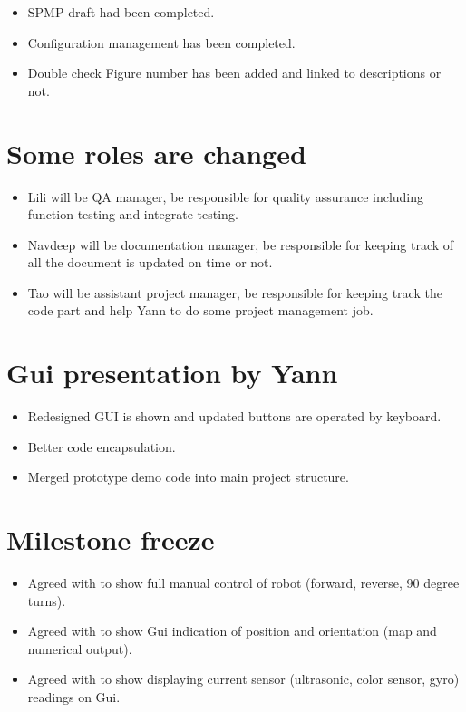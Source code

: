 \documentclass[11pt, a4paper]{article}
\begin{document}
\begin{itemize}
\item SPMP draft had been completed. 
\item Configuration management has been completed.
\item Double check Figure number has been added and linked to descriptions or not.
\end{itemize}

\section{Some roles are changed}

\begin{itemize}
\item Lili will be QA manager, be responsible for quality assurance including function testing and integrate testing.
\item Navdeep will be documentation manager, be responsible for keeping track of all the document is updated on time or not.
\item Tao will be assistant project manager, be responsible for keeping track the code part and help Yann to do some project management job.
\end{itemize}

\section{Gui presentation by Yann}

\begin{itemize}
\item Redesigned GUI is shown and updated buttons are operated by keyboard.
\item Better code encapsulation.
\item Merged prototype demo code into main project structure.
\end{itemize}

\section{Milestone freeze}
\begin{itemize}
\item Agreed with to show full manual control of robot (forward, reverse, 90 degree turns).
\item Agreed with to show Gui indication of position and orientation (map and numerical output).
\item Agreed with to show displaying current sensor (ultrasonic, color sensor, gyro) readings on Gui.
\end{itemize}
\end{document}
